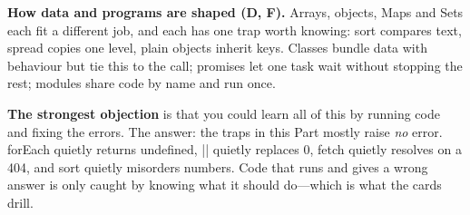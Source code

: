 \documentclass[10pt]{article}
\newcommand{\code}[1]{{\ttfamily\small #1}}
\begin{document}
\textbf{How data and programs are shaped (D, F).} Arrays, objects, Maps and Sets each fit a different job, and each has one trap worth knowing: \code{sort} compares text, spread copies one level, plain objects inherit keys. Classes bundle data with behaviour but tie \code{this} to the call; promises let one task wait without stopping the rest; modules share code by name and run once.

\textbf{The strongest objection} is that you could learn all of this by running code and fixing the errors. The answer: the traps in this Part mostly raise \emph{no} error. \code{forEach} quietly returns \code{undefined}, \code{||} quietly replaces \code{0}, \code{fetch} quietly resolves on a 404, and \code{sort} quietly misorders numbers. Code that runs and gives a wrong answer is only caught by knowing what it should do---which is what the cards drill.
\end{document}
